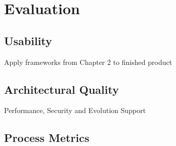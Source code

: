 \chapter{Evaluation}
\label{evaluation}

\section{Usability}

Apply frameworks from Chapter 2 to finished product

\section{Architectural Quality}

Performance, Security and Evolution Support

\section{Process Metrics}